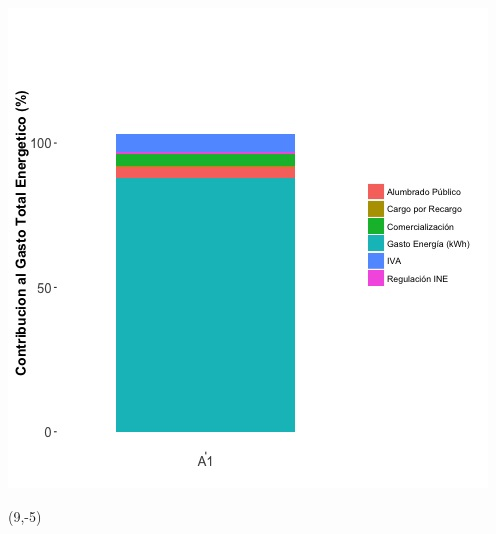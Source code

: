 \documentclass{article}\usepackage[]{graphicx}\usepackage[]{color}
\newenvironment{knitrout}{}{} %
\begin{document}
\begin{knitrout}
\color{fgcolor}
\includegraphics[scale=0.65]{figure/A1_costvars_plot.jpg} 
\end{knitrout}

 \begin{textblock}{1}(9,-5)
\begin{minipage}{20em}
\begingroup

\endgroup
\end{minipage}
\end{textblock}



%


\end{document}
